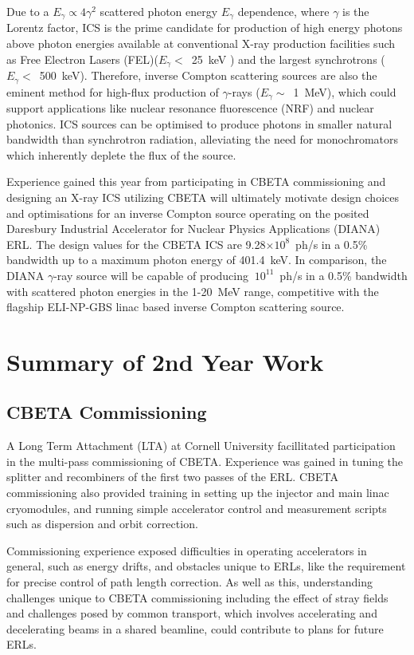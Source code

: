 \documentclass[10pt]{article}
\begin{document}
Due to a $E_{\gamma} \propto 4\gamma^{2}$ scattered photon energy $E_{\gamma}$ dependence, where $\gamma$ is the Lorentz factor, ICS is the prime candidate for production of high energy photons above photon energies available at conventional X-ray production facilities such as Free Electron Lasers (FEL)($E_{\gamma} <$~25~keV \cite{schneidmiller2011photon}) and the largest synchrotrons ($E_{\gamma} <$~500~keV). Therefore, inverse Compton scattering sources are also the eminent method for high-flux production of $\gamma$-rays ($E_{\gamma} \sim$~1~MeV), which could support applications like nuclear resonance fluorescence (NRF) and nuclear photonics. ICS sources can be optimised to produce photons in smaller natural bandwidth than synchrotron radiation, alleviating the need for monochromators which inherently deplete the flux of the source. 

Experience gained this year from participating in CBETA commissioning and designing an X-ray ICS utilizing CBETA will ultimately motivate design choices and optimisations for an inverse Compton source operating on the posited Daresbury Industrial Accelerator for Nuclear Physics Applications (DIANA) ERL. The design values for the CBETA ICS are 9.28$\times 10^{8}$~ph/s in a 0.5\% bandwidth up to a maximum photon energy of 401.4~keV. In comparison, the DIANA $\gamma$-ray source will be capable of producing $~10^{11}$~ph/s in a 0.5\% bandwidth with scattered photon energies in the 1-20~MeV range, competitive with the flagship ELI-NP-GBS \cite{adriani2014technical} linac based inverse Compton scattering source.    

\section*{Summary of 2nd Year Work}

\subsection*{CBETA Commissioning}

A Long Term Attachment (LTA) at Cornell University facillitated participation in the multi-pass commissioning of CBETA. Experience was gained in tuning the splitter and recombiners of the first two passes of the ERL. CBETA commissioning also provided training in setting up the injector and main linac cryomodules, and running simple accelerator control and measurement scripts such as dispersion and orbit correction.       

Commissioning experience exposed difficulties in operating accelerators in general, such as energy drifts, and obstacles unique to ERLs, like the requirement for precise control of path length correction. As well as this, understanding challenges unique to CBETA commissioning including the effect of stray fields and challenges posed by common transport, which involves accelerating and decelerating beams in a shared beamline, could contribute to plans for future ERLs. 
\end{document}
